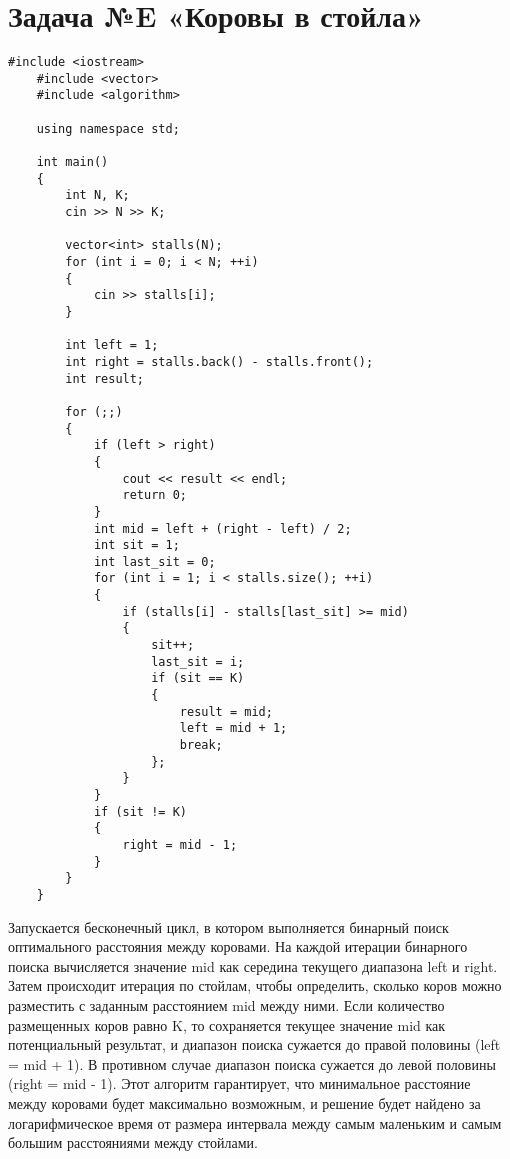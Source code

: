 \documentclass{article}
\begin{document}
\section{Задача №E «Коровы в стойла»}
\begin{lstlisting}[frame=single, basicstyle=\ttfamily, breaklines=true, breakatwhitespace=true, postbreak=\mbox{\textcolor{red}{$\hookrightarrow$}\space}]
    #include <iostream>
    #include <vector>
    #include <algorithm>
    
    using namespace std;
    
    int main()
    {
        int N, K;
        cin >> N >> K;
    
        vector<int> stalls(N);
        for (int i = 0; i < N; ++i)
        {
            cin >> stalls[i];
        }
    
        int left = 1;
        int right = stalls.back() - stalls.front();
        int result;
    
        for (;;)
        {
            if (left > right)
            {
                cout << result << endl;
                return 0;
            }
            int mid = left + (right - left) / 2;
            int sit = 1;
            int last_sit = 0;
            for (int i = 1; i < stalls.size(); ++i)
            {
                if (stalls[i] - stalls[last_sit] >= mid)
                {
                    sit++;
                    last_sit = i;
                    if (sit == K)
                    {
                        result = mid;
                        left = mid + 1;
                        break;
                    };
                }
            }
            if (sit != K)
            {
                right = mid - 1;
            }
        }
    }    
\end{lstlisting}
Запускается бесконечный цикл, в котором выполняется бинарный поиск оптимального расстояния между коровами.
На каждой итерации бинарного поиска вычисляется значение mid как середина текущего диапазона left и right.
Затем происходит итерация по стойлам, чтобы определить, сколько коров можно разместить с заданным расстоянием mid между ними.
Если количество размещенных коров равно K, то сохраняется текущее значение mid как потенциальный результат, и диапазон поиска сужается до правой половины (left = mid + 1).
В противном случае диапазон поиска сужается до левой половины (right = mid - 1).
Этот алгоритм гарантирует, что минимальное расстояние между коровами будет максимально возможным, и решение будет найдено за логарифмическое время от размера интервала между самым маленьким и самым большим расстояниями между стойлами.
\end{document}
